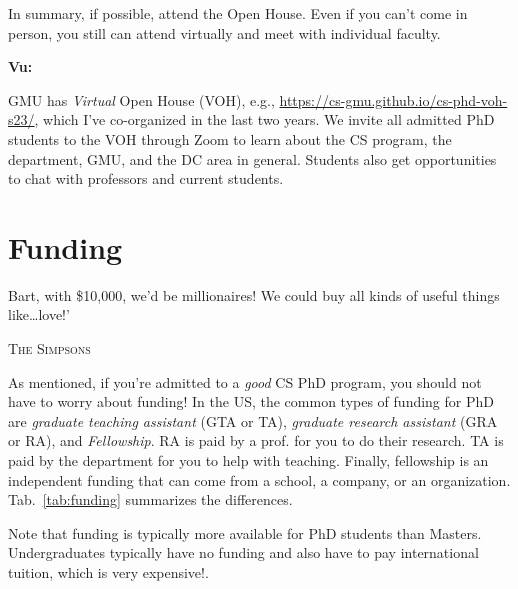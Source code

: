 \documentclass[11pt]{article}
\newenvironment{commentbox}[1][]{
\small
    \begin{cbox}
    \textbf{#1} 
 }{
   \end{cbox}
}
\begin{document}
In summary, if possible, attend the Open House.  Even if you can't come in person, you still can attend virtually and meet with individual faculty.

\begin{commentbox}[Vu:]
GMU has \emph{Virtual} Open House (VOH), e.g., \url{https://cs-gmu.github.io/cs-phd-voh-s23/}, which I've co-organized in the last two years. We invite all admitted PhD students to the VOH through Zoom to learn about the CS program, the department, GMU, and the DC area in general. Students also get opportunities to chat with professors and current students.
\end{commentbox}



\section{Funding}\label{sec:funding}

\epigraph{Bart, with \$10,000, we’d be millionaires! We could buy all kinds of useful things like…love!’}{\textsc{The Simpsons}}

As mentioned, if you're admitted to a \emph{good} CS PhD program, you should not have to worry about funding!  
In the US, the common types of funding for PhD are \emph{graduate teaching assistant} (GTA or TA), \emph{graduate research assistant} (GRA or RA), and \emph{Fellowship}.
RA is paid by a prof. for you to do their research. TA is paid by the department for you to help with teaching. Finally, fellowship is an independent funding that can come from a school, a company, or an organization. Tab.~\ref{tab:funding} summarizes the differences.


Note that funding is typically more available for PhD students than 
Masters. Undergraduates typically have no funding and also have to pay international tuition, which is very expensive!.  
\end{document}
